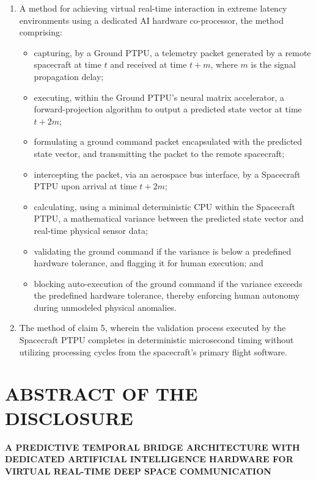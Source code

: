 \documentclass[12pt,a4paper]{article}
\begin{document}
\begin{enumerate}
    \item A method for achieving virtual real-time interaction in extreme latency environments using a dedicated AI hardware co-processor, the method comprising:
    \begin{itemize}
        \item capturing, by a Ground PTPU, a telemetry packet generated by a remote spacecraft at time $t$ and received at time $t+m$, where $m$ is the signal propagation delay;
        \item executing, within the Ground PTPU's neural matrix accelerator, a forward-projection algorithm to output a predicted state vector at time $t+2m$;
        \item formulating a ground command packet encapsulated with the predicted state vector, and transmitting the packet to the remote spacecraft;
        \item intercepting the packet, via an aerospace bus interface, by a Spacecraft PTPU upon arrival at time $t+2m$;
        \item calculating, using a minimal deterministic CPU within the Spacecraft PTPU, a mathematical variance between the predicted state vector and real-time physical sensor data;
        \item validating the ground command if the variance is below a predefined hardware tolerance, and flagging it for human execution; and
        \item blocking auto-execution of the ground command if the variance exceeds the predefined hardware tolerance, thereby enforcing human autonomy during unmodeled physical anomalies.
    \end{itemize}

    \item The method of claim 5, wherein the validation process executed by the Spacecraft PTPU completes in deterministic microsecond timing without utilizing processing cycles from the spacecraft's primary flight software.
\end{enumerate}

\newpage

\section*{ABSTRACT OF THE DISCLOSURE}
\textbf{A PREDICTIVE TEMPORAL BRIDGE ARCHITECTURE WITH DEDICATED ARTIFICIAL INTELLIGENCE HARDWARE FOR VIRTUAL REAL-TIME DEEP SPACE COMMUNICATION} \\
\vspace{0.5cm}
\end{document}
